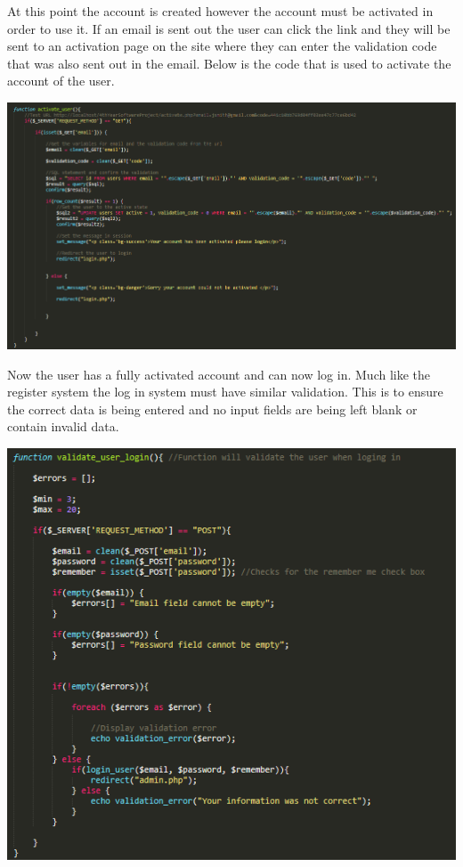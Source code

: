 At this point the account is created however the account must be activated in order to use it. If an email is sent out the user can click the link and they will be sent to an activation page on the site where they can enter the validation code that was also sent out in the email. Below is the code that is used to activate the account of the user.

\includegraphics[width=\textwidth,height=\textheight,keepaspectratio]{img/activate.png}

Now the user has a fully activated account and can now log in. Much like the register system the log in system must have similar validation. This is to ensure the correct data is being entered and no input fields are being left blank or contain invalid data.

\includegraphics[width=\textwidth,height=\textheight,keepaspectratio]{img/validateLogin.png}

